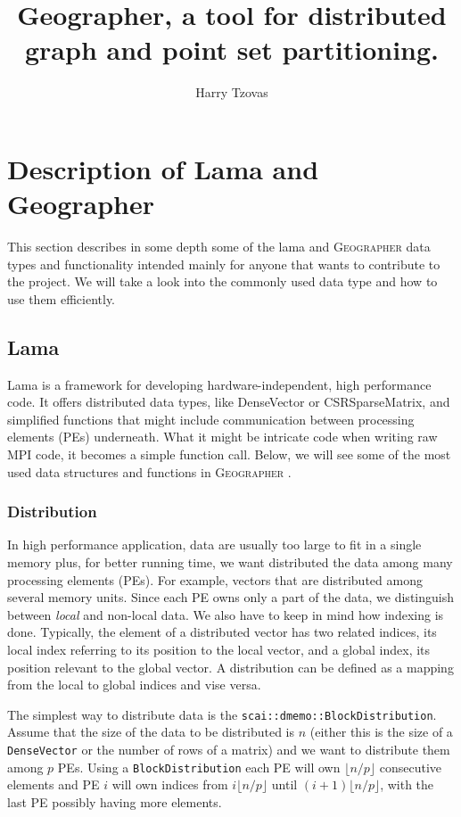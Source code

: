 \documentclass[a4paper,10pt]{article}
\author{Harry Tzovas}
\title{Geographer, a tool for distributed graph and point set partitioning.}
\newcommand{\geo}{\textsc{Geographer} }
\newcommand{\MI}[1]{\texttt{#1}}
\begin{document}
\maketitle


\section*{Description of Lama and Geographer}

This section describes in some depth some of the lama and \geo data types and functionality intended
mainly for anyone that wants to contribute to the project. We will take a look into the commonly
used data type and how to use them efficiently.

\subsection*{Lama}

Lama is a framework for developing hardware-independent, high performance code. 
It offers distributed 
data types, like DenseVector or CSRSparseMatrix, and simplified functions that might 
include communication between processing elements (PEs) underneath.
What it might be intricate code when writing raw MPI code,
it becomes a simple function call. Below, we will see some of the most used data structures and 
functions in \geo.


\subsubsection*{Distribution}

In high performance application, data are usually too large to fit in a single memory plus, for
better running time, we want distributed the data among many processing elements (PEs).
For example, vectors that are distributed among several memory units.
Since each PE owns only a part of the data, we distinguish between \emph{local} 
and non-local data. We also have to keep in mind how indexing is done. Typically, the element
of a distributed vector has two related indices, its local index referring to its position
to the local vector, and a global index, its position relevant to the global vector.
A distribution can be defined as a mapping from the local to global indices and vise versa.

The simplest way to distribute data
is the \MI{scai::dmemo::BlockDistribution}. Assume that the size of the data to be 
distributed is $n$
(either this is the size of a \MI{DenseVector} or the number of rows of a matrix) and we want
to distribute them among $p$ PEs. Using a \MI{BlockDistribution} each PE will 
own $\lfloor n/p \rfloor$
consecutive elements and PE $i$ will own indices from $i\lfloor n/p \rfloor$ 
until $(i+1)\lfloor n/p \rfloor$, with the last PE possibly having more elements.
\end{document}
